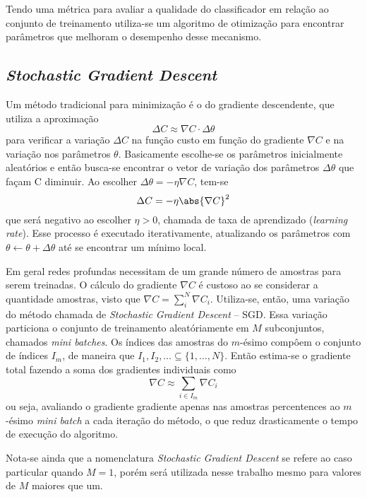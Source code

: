 Tendo uma métrica para avaliar a qualidade do classificador em relação ao conjunto de treinamento utiliza-se um algoritmo de otimização para encontrar parâmetros que melhoram o desempenho desse mecanismo.

\subsection{\textit{Stochastic Gradient Descent}}
\label{sec:sgd}
Um método tradicional para minimização é o do gradiente descendente, que utiliza a aproximação
\begin{equation}
\Delta C \approx \nabla C \cdot \Delta \theta
\end{equation}
para verificar a variação $\Delta C$ na função custo em função do gradiente $\nabla C$ e na variação nos parâmetros $\theta$. Basicamente escolhe-se os parâmetros inicialmente aleatórios e então busca-se encontrar o vetor de variação dos parâmetros $\Delta \theta$ que façam C diminuir. Ao escolher $\Delta \theta = -\eta \nabla C$, tem-se
\begin{equation}
\Delta C = -\eta \abs{\nabla C}^2
\end{equation}
que será negativo ao escolher $\eta > 0$, chamada de taxa de aprendizado (\textit{learning rate}). Esse processo é executado iterativamente, atualizando os parâmetros com $\theta \gets \theta + \Delta \theta$ até se encontrar um mínimo local.

Em geral redes profundas necessitam de um grande número de amostras para serem treinadas. O cálculo do gradiente $\nabla C$ é custoso ao se considerar a quantidade amostras, visto que $\nabla C = \sum_i^N \nabla C_i$. Utiliza-se, então, uma variação do método chamada de \textit{Stochastic Gradient Descent} -- SGD. Essa variação particiona o conjunto de treinamento aleatóriamente em $M$ subconjuntos, chamados \textit{mini batches}. Os índices das amostras do $m$-ésimo  compôem o conjunto de índices $I_m$, de maneira que $I_1, I_2,\dots \subseteq \{1,\dots,N\}$. Então estima-se o gradiente total fazendo a soma dos gradientes individuais como
\begin{equation}
\nabla C \approx \sum_{i \in I_m} \nabla C_i
\end{equation}
ou seja, avaliando o gradiente gradiente apenas nas amostras percentences ao $m$-ésimo \textit{mini batch} a cada iteração do método, o que reduz drasticamente o tempo de execução do algoritmo.

Nota-se ainda que a nomenclatura \textit{Stochastic Gradient Descent} se refere ao caso particular quando $M=1$, porém será utilizada nesse trabalho mesmo para valores de $M$ maiores que um.

